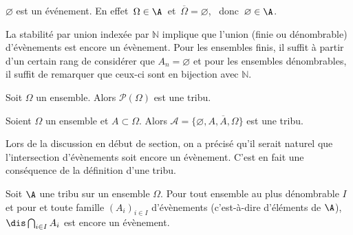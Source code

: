 \documentclass[a4paper,10pt]{report}
\begin{document}
\vspace{0.2cm}

\begin{rems}
\item $\varnothing$ est un événement. En effet $\,\Omega \in\A\,$ et $\,\overline{\Omega} = \varnothing$, \ donc $\,\varnothing\in\A$.
\item La stabilité par union indexée par $\mathbb{N}$ implique que l'union (finie ou dénombrable) d'évènements est encore un évènement. Pour les ensembles finis, il suffit à partir d'un certain rang de considérer que $A_n = \varnothing$ et pour les ensembles dénombrables, il suffit de remarquer que ceux-ci sont en bijection avec $\mathbb{N}$.
\end{rems}

\medskip

\begin{exems}
\item Soit $\Omega$ un ensemble. Alors $\mathcal{P}(\Omega)$ est une tribu.
\item Soient $\Omega$ un ensemble et $A \subset \Omega$. Alors $\mathcal{A} = \lbrace \varnothing, A, \overline{A}, \Omega \rbrace$ est une tribu. 
\end{exems}

\vspace{0.2cm}

\noindent Lors de la discussion en début de section, on a précisé qu'il serait naturel que l'intersection d'évènements soit encore un évènement. C'est en fait une conséquence de la définition d'une tribu.

\vspace{0.2cm}


\begin{prop}
Soit $\A$ une tribu sur un ensemble $\Omega$. Pour tout ensemble au plus dénombrable $I$ et pour et toute famille $(A_i)_{i \in I}$ d'évènements (c'est-à-dire d'éléments de $\A$), $\dis \bigcap_{i \in I} A_i$ est encore un évènement.
\end{prop}

\begin{preuve} 

\vspace{6cm}
%
\end{preuve}
%
\end{document}
